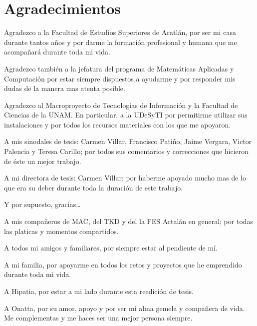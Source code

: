 \chapter*{Agradecimientos}

{\small
Agradezco a la Facultad de Estudios Superiores de Acatlán, por ser mi casa durante tantos años y por darme la formación profesional y humana que me acompañará durante toda mi vida.

Agradezco también a la jefatura del programa de Matemáticas Aplicadas y Computación por estar siempre dispuestos a ayudarme y por responder mis dudas de la manera mas atenta posible.

Agradezco al Macroproyecto de Tecnologias de Información y la Facultad de Ciencias de la UNAM. En particular, a la UDeSyTI por permitirme utilizar sus instalaciones y por todos los recursos materiales con los que me apoyaron.

A mis sinodales de tesis: Carmen Villar, Francisco Patiño, Jaime Vergara, Victor Palencia y Teresa Carillo; por todos sus comentarios y correcciones que hicieron de éste un mejor trabajo.

A mi directora de tesis: Carmen Villar; por haberme apoyado mucho mas de lo que era su deber durante toda la duración de este trabajo.

Y por supuesto, gracias\ldots

A mis compañeros de MAC, del TKD y del la FES Actalán en general; por todas las platicas y momentos compartidos.

A todos mi amigos y familiares, por siempre estar al pendiente de mí.

A mi familia, por apoyarme en todos los retos y proyectos que he emprendido durante toda mi vida.

A Hipatia, por estar a mi lado durante esta reedición de tesis.

A Onatta, por su amor, apoyo y por ser mi alma gemela y compañera de vida. Me complementas y me haces ser una mejor persona siempre.
}
